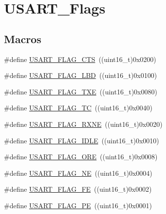 \hypertarget{group___u_s_a_r_t___flags}{}\section{U\+S\+A\+R\+T\+\_\+\+Flags}
\label{group___u_s_a_r_t___flags}
\subsection*{Macros}
\begin{DoxyCompactItemize}
\item 
\#define \mbox{\hyperlink{group___u_s_a_r_t___flags_ga94b7272319cca88a65075d5cb6048441}{U\+S\+A\+R\+T\+\_\+\+F\+L\+A\+G\+\_\+\+C\+TS}}~((uint16\+\_\+t)0x0200)
\item 
\#define \mbox{\hyperlink{group___u_s_a_r_t___flags_ga27be6517de20ce14711f71dcd5a7b91f}{U\+S\+A\+R\+T\+\_\+\+F\+L\+A\+G\+\_\+\+L\+BD}}~((uint16\+\_\+t)0x0100)
\item 
\#define \mbox{\hyperlink{group___u_s_a_r_t___flags_ga7129f13333f2a7218838cc32fe507bfa}{U\+S\+A\+R\+T\+\_\+\+F\+L\+A\+G\+\_\+\+T\+XE}}~((uint16\+\_\+t)0x0080)
\item 
\#define \mbox{\hyperlink{group___u_s_a_r_t___flags_gae7b85c9e2cc86af5bbc8b8d8b854410f}{U\+S\+A\+R\+T\+\_\+\+F\+L\+A\+G\+\_\+\+TC}}~((uint16\+\_\+t)0x0040)
\item 
\#define \mbox{\hyperlink{group___u_s_a_r_t___flags_ga11d6b70c8f00216b6d8a43790dfdcf2f}{U\+S\+A\+R\+T\+\_\+\+F\+L\+A\+G\+\_\+\+R\+X\+NE}}~((uint16\+\_\+t)0x0020)
\item 
\#define \mbox{\hyperlink{group___u_s_a_r_t___flags_gac2f1ccc91a834f9cbec3f058872b972a}{U\+S\+A\+R\+T\+\_\+\+F\+L\+A\+G\+\_\+\+I\+D\+LE}}~((uint16\+\_\+t)0x0010)
\item 
\#define \mbox{\hyperlink{group___u_s_a_r_t___flags_gabdb285b5c1876d93f9c802f9304538d5}{U\+S\+A\+R\+T\+\_\+\+F\+L\+A\+G\+\_\+\+O\+RE}}~((uint16\+\_\+t)0x0008)
\item 
\#define \mbox{\hyperlink{group___u_s_a_r_t___flags_ga81781d27ffc8b85dfaf7b7b791229547}{U\+S\+A\+R\+T\+\_\+\+F\+L\+A\+G\+\_\+\+NE}}~((uint16\+\_\+t)0x0004)
\item 
\#define \mbox{\hyperlink{group___u_s_a_r_t___flags_ga3551a32bac49a2ec040e5fdafcc9c4bd}{U\+S\+A\+R\+T\+\_\+\+F\+L\+A\+G\+\_\+\+FE}}~((uint16\+\_\+t)0x0002)
\item 
\#define \mbox{\hyperlink{group___u_s_a_r_t___flags_ga5e87fde5704f27c75df25395e23404ad}{U\+S\+A\+R\+T\+\_\+\+F\+L\+A\+G\+\_\+\+PE}}~((uint16\+\_\+t)0x0001)

\end{DoxyCompactItemize}

